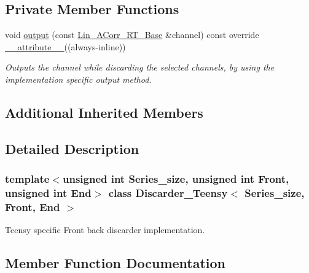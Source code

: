 \subsection*{Private Member Functions}
\begin{DoxyCompactItemize}
\item 
void \hyperlink{classDiscarder__Teensy_a4edb6d02ac299d4c578a4c8522f0dffd}{output} (const \hyperlink{classLin__ACorr__RT__Base}{Lin\+\_\+\+A\+Corr\+\_\+\+R\+T\+\_\+\+Base} \&channel) const override \hyperlink{utilities_8hpp_a103d5b3998e0dd804213c8f30a094f4d}{\+\_\+\+\_\+attribute\+\_\+\+\_\+}((always-\/inline))
\begin{DoxyCompactList}\small\item\em Outputs the channel while discarding the selected channels, by using the implementation specific output method. \end{DoxyCompactList}\end{DoxyCompactItemize}
\subsection*{Additional Inherited Members}


\subsection{Detailed Description}
\subsubsection*{template$<$unsigned int Series\+\_\+size, unsigned int Front, unsigned int End$>$\newline
class Discarder\+\_\+\+Teensy$<$ Series\+\_\+size, Front, End $>$}

Teensy specific Front back discarder implementation. 

\subsection{Member Function Documentation}
\mbox{\label{classDiscarder__Teensy_a4edb6d02ac299d4c578a4c8522f0dffd}} 
